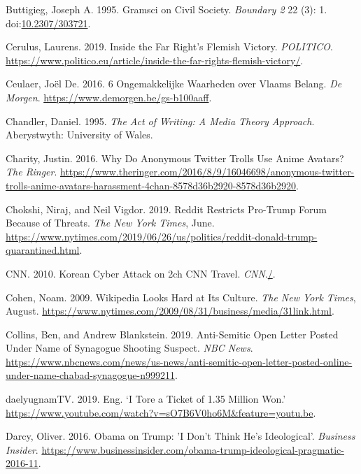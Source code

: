 \documentclass[10pt,british,A4paper,,openany]{memoir}
\begin{document}
\hypertarget{ref-buttigieg_gramsci_1995}{}
Buttigieg, Joseph A. 1995. Gramsci on Civil Society. \emph{Boundary 2}
22 (3): 1. doi:\href{https://doi.org/10.2307/303721}{10.2307/303721}.

\hypertarget{ref-cerulus_inside_2019}{}
Cerulus, Laurens. 2019. Inside the Far Right's Flemish Victory.
\emph{POLITICO}.
\url{https://www.politico.eu/article/inside-the-far-rights-flemish-victory/}.

\hypertarget{ref-ceulaer_6_2016}{}
Ceulaer, Joël De. 2016. 6 Ongemakkelijke Waarheden over Vlaams Belang.
\emph{De Morgen}. \url{https://www.demorgen.be/gs-b100aaff}.

\hypertarget{ref-chandler_act_1995}{}
Chandler, Daniel. 1995. \emph{The Act of Writing: A Media Theory
Approach}. Aberystwyth: University of Wales.

\hypertarget{ref-charity_why_2016}{}
Charity, Justin. 2016. Why Do Anonymous Twitter Trolls Use Anime
Avatars? \emph{The Ringer}.
\url{https://www.theringer.com/2016/8/9/16046698/anonymous-twitter-trolls-anime-avatars-harassment-4chan-8578d36b2920-8578d36b2920}.

\hypertarget{ref-chokshi_reddit_2019}{}
Chokshi, Niraj, and Neil Vigdor. 2019. Reddit Restricts Pro-Trump Forum
Because of Threats. \emph{The New York Times}, June.
\url{https://www.nytimes.com/2019/06/26/us/politics/reddit-donald-trump-quarantined.html}.

\hypertarget{ref-cnn_korean_2010}{}
CNN. 2010. Korean Cyber Attack on 2ch CNN Travel.
\emph{CNN}.\href{./}{/}.

\hypertarget{ref-cohen_wikipedia_2009}{}
Cohen, Noam. 2009. Wikipedia Looks Hard at Its Culture. \emph{The New
York Times}, August.
\url{https://www.nytimes.com/2009/08/31/business/media/31link.html}.

\hypertarget{ref-collins_anti-semitic_2019}{}
Collins, Ben, and Andrew Blankstein. 2019. Anti-Semitic Open Letter
Posted Under Name of Synagogue Shooting Suspect. \emph{NBC News}.
\url{https://www.nbcnews.com/news/us-news/anti-semitic-open-letter-posted-online-under-name-chabad-synagogue-n999211}.

\hypertarget{ref-daelyugnamtv_eng._2019}{}
daelyugnamTV. 2019. Eng. `I Tore a Ticket of 1.35 Million Won.'
\url{https://www.youtube.com/watch?v=sO7B6V0ho6M\&feature=youtu.be}.

\hypertarget{ref-darcy_obama_2016}{}
Darcy, Oliver. 2016. Obama on Trump: 'I Don't Think He's Ideological'.
\emph{Business Insider}.
\url{https://www.businessinsider.com/obama-trump-ideological-pragmatic-2016-11}.
\end{document}

